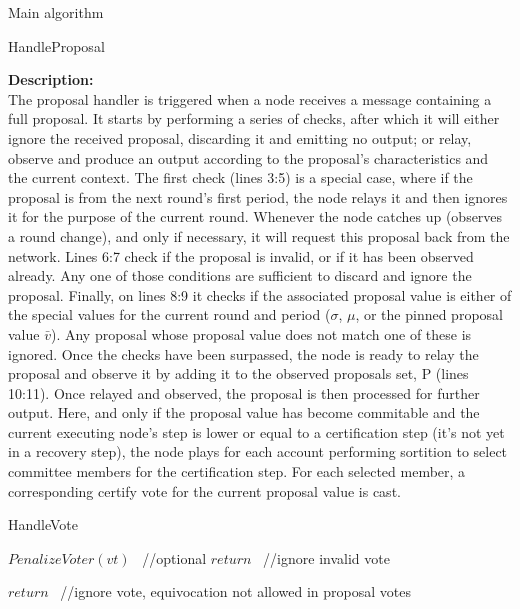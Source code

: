 \documentclass[10pt,a4paper]{article}
\begin{document}
\begin{section}{Main algorithm}
\begin{subsection}{HandleProposal}
    
    \noindent \textbf{Description:}\\
The proposal handler is triggered when a node receives a message containing a full proposal.
It starts by performing a series of checks, after which it will either ignore the received
proposal, discarding it and emitting no output; or relay, observe and produce an output
according to the proposal's characteristics and the current context.
The first check (lines 3:5) is a special case, where if the proposal is from the next round's 
first period, the node relays it and then ignores it for the purpose of the current round. 
Whenever the node catches up (observes a round change), and only if necessary, it will request 
this proposal back from the network.
Lines 6:7 check if the proposal is invalid, or if it has been observed already. Any one of those
conditions are sufficient to discard and ignore the proposal.
Finally, on lines 8:9 it checks if the associated proposal value is either of the special values for the current
round and period ($\sigma$, $\mu$, or the pinned proposal value $\bar{v}$). Any proposal whose proposal value does not match
one of these is ignored.
Once the checks have been surpassed, the node is ready to relay the proposal and observe it by adding
it to the observed proposals set, P (lines 10:11).
Once relayed and observed, the proposal is then processed for further output.
Here, and only if the proposal value has become commitable and the current executing node's step is lower or equal
to a certification step (it's not yet in a recovery step), the node plays for each account performing sortition
to select committee members for the certification step. For each selected member, a corresponding certify vote for
the current proposal value is cast.


\end{subsection}


\begin{subsection}{HandleVote}\label{ssect:HandleVote}

    \begin{algorithm}[H]
        \begin{algorithmic}[1]

                \State $PenalizeVoter(vt)$ \ //optional
                \State $return$ \ //ignore invalid vote
            \EndIf

                \State $return$ \ //ignore vote, equivocation not allowed in proposal votes
            \EndIf


\end{algorithmic}
\end{algorithm}
\end{subsection}
\end{section}
\end{document}
